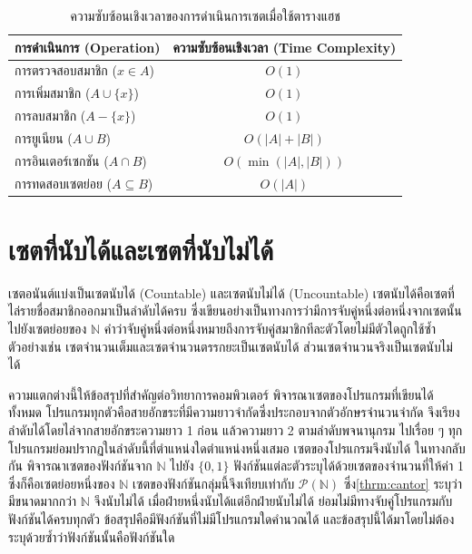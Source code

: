 \begin{table}[H]
\centering
\caption{ความซับซ้อนเชิงเวลาของการดำเนินการเซตเมื่อใช้ตารางแฮช}
\label{tab:hash-complexity}
\renewcommand{\arraystretch}{1.3}
\begin{tabular}{|l|c|}
\hline
\textbf{การดำเนินการ (Operation)} & \textbf{ความซับซ้อนเชิงเวลา (Time Complexity)} \\
\hline
การตรวจสอบสมาชิก ($x \in A$) & $O(1)$ \\
การเพิ่มสมาชิก ($A \cup \{x\}$) & $O(1)$ \\
การลบสมาชิก ($A - \{x\}$) & $O(1)$ \\
การยูเนียน ($A \cup B$) & $O(|A| + |B|)$ \\
การอินเตอร์เซกชัน ($A \cap B$) & $O(\min(|A|, |B|))$ \\
การทดสอบเซตย่อย ($A \subseteq B$) & $O(|A|)$ \\
\hline
\end{tabular}
\end{table}

\section{เซตที่นับได้และเซตที่นับไม่ได้}
\label{sec:countable-uncountable}

เซตอนันต์แบ่งเป็นเซตนับได้ (Countable) และเซตนับไม่ได้ (Uncountable) เซตนับได้คือเซตที่ไล่รายชื่อสมาชิกออกมาเป็นลำดับได้ครบ ซึ่งเขียนอย่างเป็นทางการว่ามีการจับคู่หนึ่งต่อหนึ่งจากเซตนั้นไปยังเซตย่อยของ $\mathbb{N}$ คำว่าจับคู่หนึ่งต่อหนึ่งหมายถึงการจับคู่สมาชิกทีละตัวโดยไม่มีตัวใดถูกใช้ซ้ำ ตัวอย่างเช่น เซตจำนวนเต็มและเซตจำนวนตรรกยะเป็นเซตนับได้ ส่วนเซตจำนวนจริงเป็นเซตนับไม่ได้~\parencite{epp2019discrete}

ความแตกต่างนี้ให้ข้อสรุปที่สำคัญต่อวิทยาการคอมพิวเตอร์ พิจารณาเซตของโปรแกรมที่เขียนได้ทั้งหมด โปรแกรมทุกตัวคือสายอักขระที่มีความยาวจำกัดซึ่งประกอบจากตัวอักษรจำนวนจำกัด จึงเรียงลำดับได้โดยไล่จากสายอักขระความยาว 1 ก่อน แล้วความยาว 2 ตามลำดับพจนานุกรม ไปเรื่อย ๆ ทุกโปรแกรมย่อมปรากฏในลำดับนี้ที่ตำแหน่งใดตำแหน่งหนึ่งเสมอ เซตของโปรแกรมจึงนับได้ ในทางกลับกัน พิจารณาเซตของฟังก์ชันจาก $\mathbb{N}$ ไปยัง $\{0, 1\}$ ฟังก์ชันแต่ละตัวระบุได้ด้วยเซตของจำนวนที่ให้ค่า 1 ซึ่งก็คือเซตย่อยหนึ่งของ $\mathbb{N}$ เซตของฟังก์ชันกลุ่มนี้จึงเทียบเท่ากับ $\mathcal{P}(\mathbb{N})$ ซึ่ง\autoref{thrm:cantor} ระบุว่ามีขนาดมากกว่า $\mathbb{N}$ จึงนับไม่ได้ เมื่อฝ่ายหนึ่งนับได้แต่อีกฝ่ายนับไม่ได้ ย่อมไม่มีทางจับคู่โปรแกรมกับฟังก์ชันได้ครบทุกตัว ข้อสรุปคือมีฟังก์ชันที่ไม่มีโปรแกรมใดคำนวณได้ และข้อสรุปนี้ได้มาโดยไม่ต้องระบุด้วยซ้ำว่าฟังก์ชันนั้นคือฟังก์ชันใด

